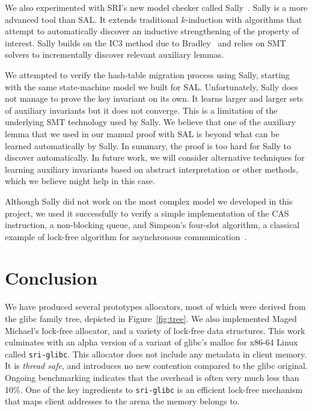 \documentclass[twoside,12pt]{cslreport}
\begin{document}
We also experimented with SRI's new model checker called
Sally~\cite{Jovanovic+Dutertre:pdkind:2016}.  Sally is a more advanced
tool than SAL. It extends traditional $k$-induction with algorithms
that attempt to automatically discover an inductive strengthening of
the property of interest. Sally builds on the IC3 method due to
Bradley~\cite{bradley2011sat} and relies on SMT solvers to
incrementally discover relevant auxiliary lemmas. 

We attempted to verify the hash-table migration process using Sally,
starting with the same state-machine model we built for
SAL. Unfortunately, Sally does not manage to prove the key invariant
on its own. It learns larger and larger sets of auxiliary invariants
but it does not converge. This is a limitation of the underlying SMT
technology used by Sally. We believe that one of the auxiliary lemma
that we used in our manual proof with SAL is beyond what can be
learned automatically by Sally. In summary, the proof is too hard for
Sally to discover automatically. In future work, we will consider
alternative techniques for learning auxiliary invariants based on
abstract interpretation or other methods, which we believe might help
in this case.

Although Sally did not work on the most complex model we developed in
this project, we used it successfully to verify a simple
implementation of the CAS instruction, a non-blocking queue, and
Simpson's four-slot algorithm, a classical example of lock-free
algorithm for asynchronous communication~\cite{Simpson:four-slot:1990}.



\chapter{Conclusion}

We  have produced  several prototypes allocators, most of which were
derived from the glibc family tree, depicted in Figure~\ref{fig:tree}.
We also implemented Maged Michael's lock-free allocator, and a variety
of lock-free data structures.
This work culminates with an alpha version of a variant of  glibc's malloc for
x86-64  Linux  called  \texttt{sri-glibc}.
This  allocator  does  not
include any metadata in client memory.  It is {\em thread safe\/}, and
introduces no new  contention compared to the  glibc original. Ongoing
benchmarking indicates that the overhead  is often very much less than
10\%.   One  of  the  key  ingredients  to  \texttt{sri-glibc}  is  an
efficient lock-free mechanism that maps  client addresses to the arena
the memory belongs to.
\end{document}

